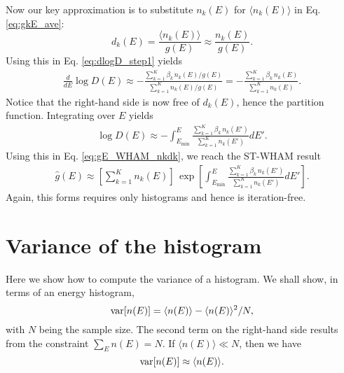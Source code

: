 \documentclass[aip,jcp,preprint,superscriptaddress]{revtex4-1}
\begin{document}
Now our key approximation
is to substitute $n_k(E)$ for $\langle n_k(E) \rangle$
in Eq. \eqref{eq:gkE_ave}:
%
\begin{equation}
  d_k(E)
  =
  \frac{ \langle n_k(E) \rangle } { g(E) }
  \approx
  \frac{ n_k(E) } { g(E) }.
  \label{eq:dkE_approx}
\end{equation}
%
Using this in Eq. \eqref{eq:dlogD_step1} yields
%
\begin{align*}
\frac{d}{dE} \log D(E)
\approx
-\frac{ \sum_{k = 1}^K \beta_k \, n_k(E) / g(E) }
{ \sum_{k = 1}^K n_k(E) / g(E) }
=
-\frac{ \sum_{k = 1}^K \beta_k \, n_k(E) }
{ \sum_{k = 1}^K n_k(E) }.
\end{align*}
%
Notice that the right-hand side
is now free of $d_k(E)$, hence the partition function.
%
Integrating over $E$ yields
%
\begin{align*}
\log D(E)
\approx
-\int^E_{E_{\min}} \frac{ \sum_{k = 1}^K \beta_k \, n_k(E') }
{ \sum_{k = 1}^K n_k(E') } dE'.
\end{align*}
%
Using this in Eq. \eqref{eq:gE_WHAM_nkdk},
we reach the ST-WHAM result
\begin{align}
\hat g(E)
\approx
\left[
  \sum_{k = 1}^K n_k(E)
\right]
\,
\exp
\left[
\int^E_{E_{\min}}
    \frac{ \sum_{k = 1}^K \beta_k \, n_k(E') }
         { \sum_{k = 1}^K n_k(E') }
  dE'
\right].
\label{eq:g_STWHAM}
\end{align}
%
Again, this forms requires
only histograms
and hence is iteration-free.






\appendix



\section{\label{sec:varhist}
Variance of the histogram}



Here we show how to compute
the variance of a histogram.
%
We shall show,
in terms of an energy histogram,
\begin{equation}
  \mathrm{var}[ n(E) ] = \langle n(E) \rangle -  \langle n(E) \rangle^2/N,
  \label{eq:varn}
\end{equation}
with $N$ being the sample size.
%
The second term on the right-hand side
results from the constraint $\sum_E n(E) = N$.
%
If $\langle n(E) \rangle \ll N$,
then we have
\[
  \mathrm{var}[ n(E) ] \approx \langle n(E) \rangle.
\]
\end{document}
